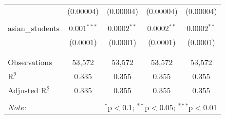 \begin{table}[!htbp]
\begin{tabular}{@{\extracolsep{-2pt}}lcccc}
  & (0.00004) & (0.00004) & (0.00004) & (0.00004) \\ 
  & & & & \\ 
 asian\_students & 0.001$^{***}$ & 0.0002$^{**}$ & 0.0002$^{**}$ & 0.0002$^{**}$ \\ 
  & (0.0001) & (0.0001) & (0.0001) & (0.0001) \\ 
  & & & & \\ 
\hline \\[-1.8ex] 
Observations & 53,572 & 53,572 & 53,572 & 53,572 \\ 
R$^{2}$ & 0.335 & 0.355 & 0.355 & 0.355 \\ 
Adjusted R$^{2}$ & 0.335 & 0.355 & 0.355 & 0.355 \\ 
\hline 
\hline \\[-1.8ex] 
\textit{Note:}  & \multicolumn{4}{r}{$^{*}$p$<$0.1; $^{**}$p$<$0.05; $^{***}$p$<$0.01} \\ 
\end{tabular} 
\end{table} 
